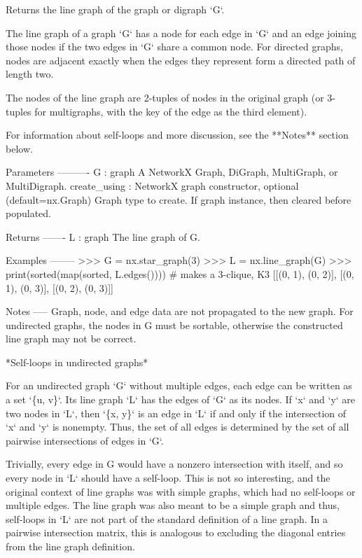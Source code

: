 \begin{DoxyVerb}Returns the line graph of the graph or digraph `G`.

The line graph of a graph `G` has a node for each edge in `G` and an
edge joining those nodes if the two edges in `G` share a common node. For
directed graphs, nodes are adjacent exactly when the edges they represent
form a directed path of length two.

The nodes of the line graph are 2-tuples of nodes in the original graph (or
3-tuples for multigraphs, with the key of the edge as the third element).

For information about self-loops and more discussion, see the **Notes**
section below.

Parameters
----------
G : graph
    A NetworkX Graph, DiGraph, MultiGraph, or MultiDigraph.
create_using : NetworkX graph constructor, optional (default=nx.Graph)
   Graph type to create. If graph instance, then cleared before populated.

Returns
-------
L : graph
    The line graph of G.

Examples
--------
>>> G = nx.star_graph(3)
>>> L = nx.line_graph(G)
>>> print(sorted(map(sorted, L.edges())))  # makes a 3-clique, K3
[[(0, 1), (0, 2)], [(0, 1), (0, 3)], [(0, 2), (0, 3)]]

Notes
-----
Graph, node, and edge data are not propagated to the new graph. For
undirected graphs, the nodes in G must be sortable, otherwise the
constructed line graph may not be correct.

*Self-loops in undirected graphs*

For an undirected graph `G` without multiple edges, each edge can be
written as a set `\{u, v\}`.  Its line graph `L` has the edges of `G` as
its nodes. If `x` and `y` are two nodes in `L`, then `\{x, y\}` is an edge
in `L` if and only if the intersection of `x` and `y` is nonempty. Thus,
the set of all edges is determined by the set of all pairwise intersections
of edges in `G`.

Trivially, every edge in G would have a nonzero intersection with itself,
and so every node in `L` should have a self-loop. This is not so
interesting, and the original context of line graphs was with simple
graphs, which had no self-loops or multiple edges. The line graph was also
meant to be a simple graph and thus, self-loops in `L` are not part of the
standard definition of a line graph. In a pairwise intersection matrix,
this is analogous to excluding the diagonal entries from the line graph
definition.


\end{DoxyVerb}

